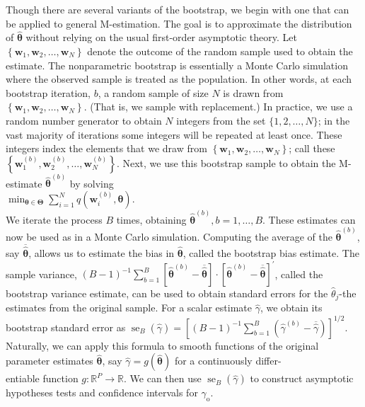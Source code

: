 \documentclass[10pt]{article}
\begin{document}
Though there are several variants of the bootstrap, we begin with one that can be applied to general M-estimation. The goal is to approximate the distribution of $\hat{\boldsymbol{\theta}}$ without relying on the usual first-order asymptotic theory. Let $\left\{\mathbf{w}_{1}, \mathbf{w}_{2}, \ldots, \mathbf{w}_{N}\right\}$ denote the outcome of the random sample used to obtain the estimate. The nonparametric bootstrap is essentially a Monte Carlo simulation where the observed sample is treated as the population. In other words, at each bootstrap iteration, $b$, a random sample of size $N$ is drawn from $\left\{\mathbf{w}_{1}, \mathbf{w}_{2}, \ldots, \mathbf{w}_{N}\right\}$. (That is, we sample with replacement.) In practice, we use a random number generator to obtain $N$ integers from the set $\{1,2, \ldots, N\}$; in the vast majority of iterations some integers will be repeated at least once. These integers index the elements that we draw from $\left\{\mathbf{w}_{1}, \mathbf{w}_{2}, \ldots, \mathbf{w}_{N}\right\}$; call these $\left\{\mathbf{w}_{1}^{(b)}, \mathbf{w}_{2}^{(b)}, \ldots, \mathbf{w}_{N}^{(b)}\right\}$. Next, we use this bootstrap sample to obtain the M-estimate $\hat{\boldsymbol{\theta}}^{(b)}$ by solving\\
$\min _{\boldsymbol{\theta} \in \boldsymbol{\Theta}} \sum_{i=1}^{N} q\left(\mathbf{w}_{i}^{(b)}, \boldsymbol{\theta}\right)$.\\
We iterate the process $B$ times, obtaining $\hat{\boldsymbol{\theta}}^{(b)}, b=1, \ldots, B$. These estimates can now be used as in a Monte Carlo simulation. Computing the average of the $\hat{\boldsymbol{\theta}}^{(b)}$, say $\overline{\hat{\boldsymbol{\theta}}}$, allows us to estimate the bias in $\hat{\boldsymbol{\theta}}$, called the bootstrap bias estimate. The sample variance, $(B-1)^{-1} \sum_{b=1}^{B}\left[\hat{\boldsymbol{\theta}}^{(b)}-\overline{\hat{\boldsymbol{\theta}}}\right] \cdot\left[\hat{\boldsymbol{\theta}}^{(b)}-\overline{\hat{\boldsymbol{\theta}}}\right]^{\prime}$, called the bootstrap variance estimate, can be used to obtain standard errors for the $\hat{\theta}_{j}$-the estimates from the original sample. For a scalar estimate $\hat{\gamma}$, we obtain its bootstrap standard error as $\operatorname{se}_{B}(\hat{\gamma})= \left[(B-1)^{-1} \sum_{b=1}^{B}\left(\hat{\gamma}^{(b)}-\overline{\hat{\gamma}}\right)\right]^{1 / 2}$. Naturally, we can apply this formula to smooth functions of the original parameter estimates $\hat{\boldsymbol{\theta}}$, say $\hat{\gamma}=g(\hat{\boldsymbol{\theta}})$ for a continuously differ-\\
entiable function $g: \mathbb{R}^{P} \rightarrow \mathbb{R}$. We can then use $\operatorname{se}_{B}(\hat{\gamma})$ to construct asymptotic hypotheses tests and confidence intervals for $\gamma_{\mathrm{o}}$.
\end{document}
